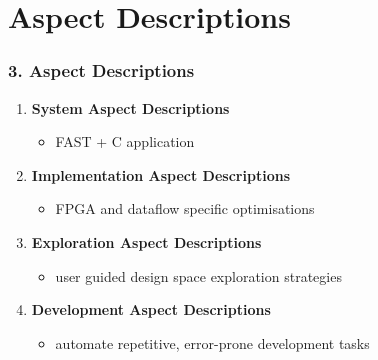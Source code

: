 \section{Aspect Descriptions}
\begin{frame}
  \frametitle{3. Aspect Descriptions}
  \begin{enumerate}
    \setlength{\itemsep}{15pt}
  \item \textbf{System Aspect Descriptions}
    \begin{itemize}
    \item FAST + C application
    \end{itemize}
  \item \textbf{Implementation Aspect Descriptions}
    \begin{itemize}
    \item FPGA and dataflow specific optimisations
    \end{itemize}
  \item \textbf{Exploration Aspect Descriptions}
    \begin{itemize}
    \item user guided design space exploration strategies
    \end{itemize}
  \item \textbf{Development Aspect Descriptions}
    \begin{itemize}
    \item automate repetitive, error-prone development tasks
    \end{itemize}
  \end{enumerate}
\end{frame}

\begin{comment}
  \begin{frame}
    \frametitle{System Aspect Descriptions}
    Hardware/Software Partitioning:
    \begin{enumerate}
      \setlength{\itemsep}{10pt}
    \item detect hotspots
    \item detect code patterns suitable for acceleration
    \item perform outlining transformation
    \item derive dataflow \texttt{fast\_f()} from \texttt{f()}
    \item place FAST pragma to link \texttt{fast\_f()} with \texttt{f()}
    \end{enumerate}
  \end{frame}
\end{comment}



